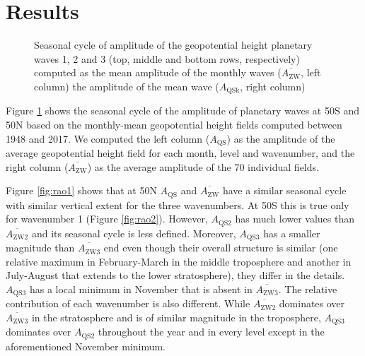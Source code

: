 \documentclass[draft,linenumbers]{agujournal2018}
\begin{document}
\section{Results}

\begin{figure}[h]

{\centering {}\newline{}

}

\caption{Seasonal cycle of amplitude of the geopotential height planetary waves 1, 2 and 3 (top, middle and bottom rows, respectively) computed as the mean amplitude of the monthly waves ($\overline{A_\mathrm{ZW} }$, left column) the amplitude of the mean wave ($A_\mathrm{QSk}$, right column)}\label{fig:rao}
\end{figure}

Figure \ref{fig:rao} shows the seasonal cycle of the amplitude of
planetary waves at 50\degree S and 50\degree N based on the monthly-mean
geopotential height fields computed between 1948 and 2017. We computed
the left column (\(A_\mathrm{QS}\)) as the amplitude of the average
geopotential height field for each month, level and wavenumber, and the
right column (\(\overline{A_\mathrm{ZW}}\)) as the average amplitude of
the 70 individual fields.

Figure \ref{fig:rao1} shows that at 50\degree N \(A_\mathrm{QS}\) and
\(\overline{A_\mathrm{ZW}}\) have a similar seasonal cycle with similar
vertical extent for the three wavenumbers. At 50\degree S this is true
only for wavenumber 1 (Figure \ref{fig:rao2}). However,
\(A_\mathrm{QS2}\) has much lower values than
\(\overline{A_\mathrm{ZW2}}\) and its seasonal cycle is less defined.
Moreover, \(A_\mathrm{QS3}\) has a smaller magnitude than
\(\overline{A_\mathrm{ZW3}}\) end even though their overall structure is
similar (one relative maximum in February-March in the middle
troposphere and another in July-August that extends to the lower
stratosphere), they differ in the details. \(A_\mathrm{QS3}\) has a
local minimum in November that is absent in
\(\overline{A_\mathrm{ZW3}}\). The relative contribution of each
wavenumber is also different. While \(\overline{A_\mathrm{ZW2}}\)
dominates over \(\overline{A_\mathrm{ZW3}}\) in the stratosphere and is
of similar magnitude in the troposphere, \(A_\mathrm{QS3}\) dominates
over \(A_\mathrm{QS2}\) throughout the year and in every level except in
the aforementioned November minimum.
\end{document}
